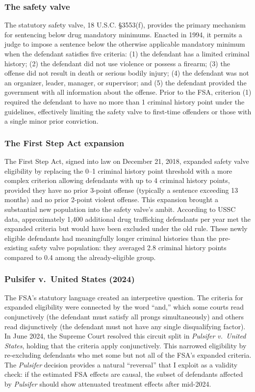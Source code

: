 \documentclass[12pt]{article}
\begin{document}
\subsubsection*{The safety valve}
The statutory safety valve, 18 U.S.C. \S 3553(f), provides the primary mechanism for sentencing below drug mandatory minimums. Enacted in 1994, it permits a judge to impose a sentence below the otherwise applicable mandatory minimum when the defendant satisfies five criteria: (1) the defendant has a limited criminal history; (2) the defendant did not use violence or possess a firearm; (3) the offense did not result in death or serious bodily injury; (4) the defendant was not an organizer, leader, manager, or supervisor; and (5) the defendant provided the government with all information about the offense. Prior to the FSA, criterion (1) required the defendant to have no more than 1 criminal history point under the guidelines, effectively limiting the safety valve to first-time offenders or those with a single minor prior conviction.

\subsubsection*{The First Step Act expansion}
The First Step Act, signed into law on December 21, 2018, expanded safety valve eligibility by replacing the 0--1 criminal history point threshold with a more complex criterion allowing defendants with up to 4 criminal history points, provided they have no prior 3-point offense (typically a sentence exceeding 13 months) and no prior 2-point violent offense. This expansion brought a substantial new population into the safety valve's ambit. According to USSC data, approximately 1,400 additional drug trafficking defendants per year met the expanded criteria but would have been excluded under the old rule. These newly eligible defendants had meaningfully longer criminal histories than the pre-existing safety valve population: they averaged 2.8 criminal history points compared to 0.4 among the already-eligible group.

\subsubsection*{Pulsifer v.\ United States (2024)}
The FSA's statutory language created an interpretive question. The criteria for expanded eligibility were connected by the word ``and,'' which some courts read conjunctively (the defendant must satisfy all prongs simultaneously) and others read disjunctively (the defendant must not have any single disqualifying factor). In June 2024, the Supreme Court resolved this circuit split in \textit{Pulsifer v.\ United States}, holding that the criteria apply conjunctively. This narrowed eligibility by re-excluding defendants who met some but not all of the FSA's expanded criteria. The \textit{Pulsifer} decision provides a natural ``reversal'' that I exploit as a validity check: if the estimated FSA effects are causal, the subset of defendants affected by \textit{Pulsifer} should show attenuated treatment effects after mid-2024.
\end{document}
